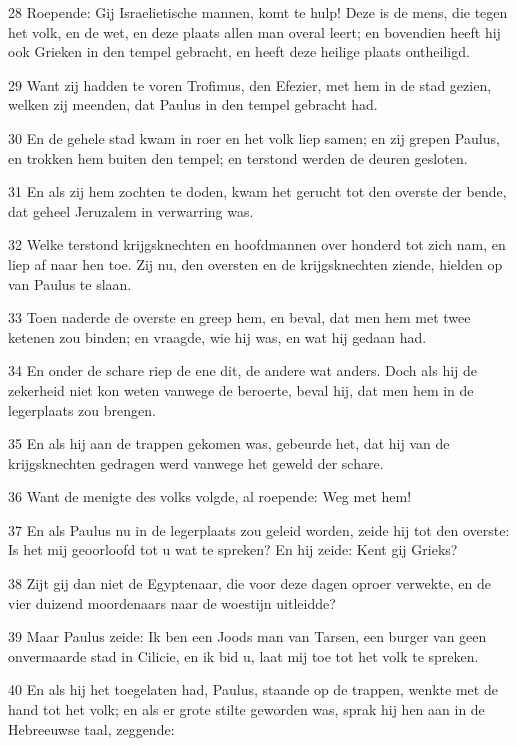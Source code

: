 \par 28 Roepende: Gij Israelietische mannen, komt te hulp! Deze is de mens, die tegen het volk, en de wet, en deze plaats allen man overal leert; en bovendien heeft hij ook Grieken in den tempel gebracht, en heeft deze heilige plaats ontheiligd.
\par 29 Want zij hadden te voren Trofimus, den Efezier, met hem in de stad gezien, welken zij meenden, dat Paulus in den tempel gebracht had.
\par 30 En de gehele stad kwam in roer en het volk liep samen; en zij grepen Paulus, en trokken hem buiten den tempel; en terstond werden de deuren gesloten.
\par 31 En als zij hem zochten te doden, kwam het gerucht tot den overste der bende, dat geheel Jeruzalem in verwarring was.
\par 32 Welke terstond krijgsknechten en hoofdmannen over honderd tot zich nam, en liep af naar hen toe. Zij nu, den oversten en de krijgsknechten ziende, hielden op van Paulus te slaan.
\par 33 Toen naderde de overste en greep hem, en beval, dat men hem met twee ketenen zou binden; en vraagde, wie hij was, en wat hij gedaan had.
\par 34 En onder de schare riep de ene dit, de andere wat anders. Doch als hij de zekerheid niet kon weten vanwege de beroerte, beval hij, dat men hem in de legerplaats zou brengen.
\par 35 En als hij aan de trappen gekomen was, gebeurde het, dat hij van de krijgsknechten gedragen werd vanwege het geweld der schare.
\par 36 Want de menigte des volks volgde, al roepende: Weg met hem!
\par 37 En als Paulus nu in de legerplaats zou geleid worden, zeide hij tot den overste: Is het mij geoorloofd tot u wat te spreken? En hij zeide: Kent gij Grieks?
\par 38 Zijt gij dan niet de Egyptenaar, die voor deze dagen oproer verwekte, en de vier duizend moordenaars naar de woestijn uitleidde?
\par 39 Maar Paulus zeide: Ik ben een Joods man van Tarsen, een burger van geen onvermaarde stad in Cilicie, en ik bid u, laat mij toe tot het volk te spreken.
\par 40 En als hij het toegelaten had, Paulus, staande op de trappen, wenkte met de hand tot het volk; en als er grote stilte geworden was, sprak hij hen aan in de Hebreeuwse taal, zeggende:

